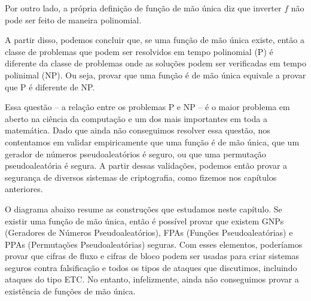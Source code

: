 Por outro lado, a própria definição de função de mão única diz que inverter $f$ não pode ser feito de maneira polinomial.

A partir disso, podemos concluir que, se uma função de mão única existe, então a classe de problemas que podem ser resolvidos em tempo polinomial (P) é diferente da classe de problemas onde as soluções podem ser verificadas em tempo polinimal (NP).
Ou seja, provar que uma função é de mão única equivale a provar que P é diferente de NP.

Essa questão -- a relação entre os problemas P e NP -- é o maior problema em aberto na ciência da computação e um dos mais importantes em toda a matemática.
Dado que ainda não conseguimos resolver essa questão, nos contentamos em validar empiricamente que uma função é de mão única, que um gerador de números pseudoaleatórios é seguro, ou que uma permutação pseudoaleatória é segura.
A partir dessas validações, podemos então provar a segurança de diversos sistemas de criptografia, como fizemos nos capítulos anteriores.

O diagrama abaixo resume as construções que estudamos neste capítulo.
Se existir uma função de mão única, então é possível provar que existem GNPs (Geradores de Números Pseudoaleatórios), FPAs (Funções Pseudoaleatórias) e PPAs (Permutações Pseudoaleatórias) seguras.
Com esses elementos, poderíamos provar que cifras de fluxo e cifras de bloco podem ser usadas para criar sistemas seguros contra falsificação e todos os tipos de ataques que discutimos, incluindo ataques do tipo ETC.
No entanto, infelizmente, ainda não conseguimos provar a existência de funções de mão única.


\begin{center}
\end{center}

